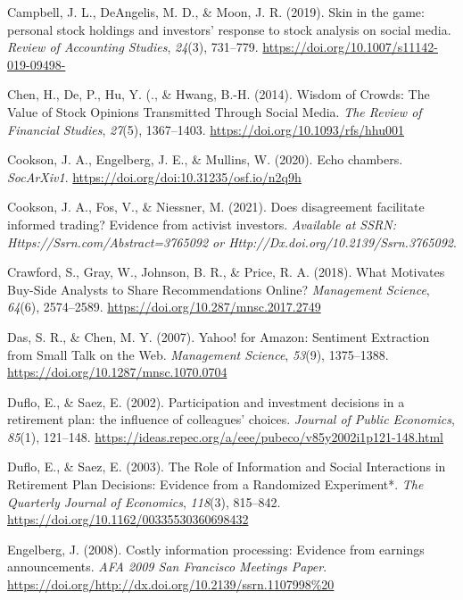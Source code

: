 \documentclass[12pt,]{article}
\begin{document}
\leavevmode\hypertarget{ref-campbell2019}{}%
Campbell, J. L., DeAngelis, M. D., \& Moon, J. R. (2019). Skin in the
game: personal stock holdings and investors' response to stock analysis
on social media. \emph{Review of Accounting Studies}, \emph{24}(3),
731--779. \url{https://doi.org/10.1007/s11142-019-09498-}

\leavevmode\hypertarget{ref-chen2014}{}%
Chen, H., De, P., Hu, Y. (., \& Hwang, B.-H. (2014). Wisdom of Crowds:
The Value of Stock Opinions Transmitted Through Social Media. \emph{The
Review of Financial Studies}, \emph{27}(5), 1367--1403.
\url{https://doi.org/10.1093/rfs/hhu001}

\leavevmode\hypertarget{ref-cookson2020}{}%
Cookson, J. A., Engelberg, J. E., \& Mullins, W. (2020). Echo chambers.
\emph{SocArXiv1}. \url{https://doi.org/doi:10.31235/osf.io/n2q9h}

\leavevmode\hypertarget{ref-cookson2021}{}%
Cookson, J. A., Fos, V., \& Niessner, M. (2021). Does disagreement
facilitate informed trading? Evidence from activist investors.
\emph{Available at SSRN: Https://Ssrn.com/Abstract=3765092 or
Http://Dx.doi.org/10.2139/Ssrn.3765092}.

\leavevmode\hypertarget{ref-crawford2018}{}%
Crawford, S., Gray, W., Johnson, B. R., \& Price, R. A. (2018). What
Motivates Buy-Side Analysts to Share Recommendations Online?
\emph{Management Science}, \emph{64}(6), 2574--2589.
\url{https://doi.org/10.287/mnsc.2017.2749}

\leavevmode\hypertarget{ref-das2007}{}%
Das, S. R., \& Chen, M. Y. (2007). Yahoo! for Amazon: Sentiment
Extraction from Small Talk on the Web. \emph{Management Science},
\emph{53}(9), 1375--1388. \url{https://doi.org/10.1287/mnsc.1070.0704}

\leavevmode\hypertarget{ref-duflo2002}{}%
Duflo, E., \& Saez, E. (2002). Participation and investment decisions in
a retirement plan: the influence of colleagues' choices. \emph{Journal
of Public Economics}, \emph{85}(1), 121--148.
\url{https://ideas.repec.org/a/eee/pubeco/v85y2002i1p121-148.html}

\leavevmode\hypertarget{ref-duflo2003}{}%
Duflo, E., \& Saez, E. (2003). The Role of Information and Social
Interactions in Retirement Plan Decisions: Evidence from a Randomized
Experiment*. \emph{The Quarterly Journal of Economics}, \emph{118}(3),
815--842. \url{https://doi.org/10.1162/00335530360698432}

\leavevmode\hypertarget{ref-engelberg2008}{}%
Engelberg, J. (2008). Costly information processing: Evidence from
earnings announcements. \emph{AFA 2009 San Francisco Meetings Paper}.
\url{https://doi.org/http://dx.doi.org/10.2139/ssrn.1107998\%20}
\end{document}
